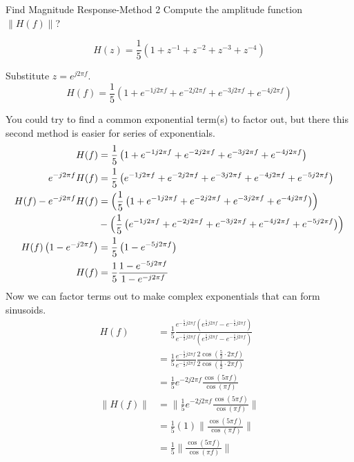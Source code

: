 \begin{example}[]{Find Magnitude Response-Method 2}
  Compute the amplitude function $\lVert H(f) \rVert$?

  \begin{equation*}
    H(z) = \frac{1}{5} \left( 1 + z^{-1} + z^{-2} + z^{-3} + z^{-4} \right)
  \end{equation*}

  \tcblower{}

  Substitute $z=e^{j 2\pi f}$.
  \begin{equation*}
    H(f) = \frac{1}{5} \left( 1 + e^{-1 j 2\pi f} + e^{-2 j 2\pi f} + e^{-3 j 2\pi f} + e^{-4 j 2\pi f} \right)
  \end{equation*}

  You could try to find a common exponential term(s) to factor out, but there this second method is easier for series of exponentials.
  \begin{align*}
    H(f) &= \frac{1}{5} \left( 1 + e^{-1 j 2\pi f} + e^{-2 j 2\pi f} + e^{-3 j 2\pi f} + e^{-4 j 2\pi f} \right) \\
    e^{-j 2\pi f} H(f) &= \frac{1}{5} \left( e^{-1 j 2\pi f} + e^{-2 j 2\pi f} + e^{-3 j 2\pi f} + e^{-4 j 2\pi f} + e^{-5 j 2\pi f} \right) \\
    H(f) - e^{-j 2\pi f} H(f) &= \Bigl( \frac{1}{5} \left( 1 + e^{-1 j 2\pi f} + e^{-2 j 2\pi f} + e^{-3 j 2\pi f} + e^{-4 j 2\pi f} \right) \Bigr) \\
    &- \Bigl( \frac{1}{5} \left( e^{-1 j 2\pi f} + e^{-2 j 2\pi f} + e^{-3 j 2\pi f} + e^{-4 j 2\pi f} + e^{-5 j 2\pi f} \right) \Bigr) \\
    H(f) \left( 1-e^{-j 2\pi f} \right) &= \frac{1}{5} \left( 1-e^{-5 j 2\pi f} \right) \\
    H(f) &= \frac{1}{5} \frac{1-e^{-5 j 2\pi f}}{1-e^{-j 2\pi f}} \\
  \end{align*}
  Now we can factor terms out to make complex exponentials that can form sinusoids.
  \begin{align*}
    H(f) &= \frac{1}{5} \frac{e^{-\frac{5}{2} j 2\pi f} \left( e^{\frac{5}{2} j 2\pi f} - e^{-\frac{5}{2} j 2\pi f} \right)}{e^{-\frac{1}{2} j 2\pi f} \left( e^{\frac{1}{2} j 2\pi f} - e^{-\frac{1}{2} j 2\pi f} \right)} \\
         &= \frac{1}{5} \frac{e^{-\frac{5}{2} j 2\pi f}}{e^{-\frac{1}{2} j 2\pi f}} \frac{2 \cos \left( \frac{5}{2} \cdot 2\pi f \right)}{2 \cos \left( \frac{1}{2} \cdot 2\pi f \right)} \\
         &= \frac{1}{5} e^{-2 j 2\pi f} \frac{\cos(5\pi f)}{\cos(\pi f)} \\
    \lVert H(f) \rVert &= \Biggl\lVert \frac{1}{5} e^{-2 j 2\pi f} \frac{\cos(5\pi f)}{\cos(\pi f)} \Biggr\rVert \\
         &= \frac{1}{5} (1) \Biggl\lVert \frac{\cos(5\pi f)}{\cos(\pi f)} \Biggr\rVert \\
         &= \frac{1}{5} \Biggl\lVert \frac{\cos(5\pi f)}{\cos(\pi f)} \Biggr\rVert \\
  \end{align*}


\end{example}
